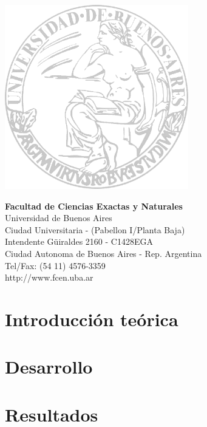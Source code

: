 \documentclass[10pt, a4paper,english,spanish]{article}
\begin{document}
\begin{multicols}{2}
\includegraphics[width=8cm]{caratula/logo-uba.png}

\columnbreak
\vspace*{4.5cm}
\raggedleft
\textbf{Facultad de Ciencias Exactas y Naturales}\\
Universidad de Buenos Aires\\
\small
Ciudad Universitaria - (Pabellon I/Planta Baja)\\
Intendente G\"uiraldes 2160 - C1428EGA\\
Ciudad Autonoma de Buenos Aires - Rep. Argentina\\
Tel/Fax: (54 11) 4576-3359\\
http://www.fcen.uba.ar
\end{multicols}

\restoregeometry

\clearpage


\tableofcontents

\vspace{3cm}

\clearpage

\setlength{\parindent}{10pt}

\section{Introducción teórica}

\clearpage

\section{Desarrollo}

\clearpage

\section{Resultados}

\clearpage
\end{document}
